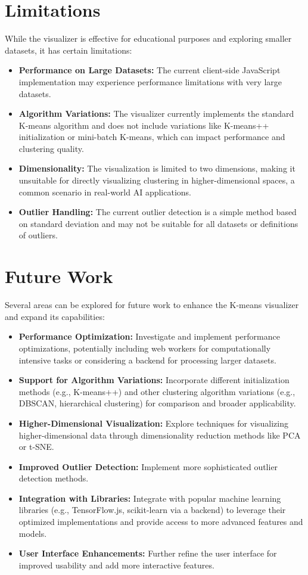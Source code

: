 \documentclass[12pt]{report}
\begin{document}
\section{Limitations}
While the visualizer is effective for educational purposes and exploring smaller datasets, it has certain limitations:
\begin{itemize}
    \item \textbf{Performance on Large Datasets:} The current client-side JavaScript implementation may experience performance limitations with very large datasets.
    \item \textbf{Algorithm Variations:} The visualizer currently implements the standard K-means algorithm and does not include variations like K-means++ initialization or mini-batch K-means, which can impact performance and clustering quality.
    \item \textbf{Dimensionality:} The visualization is limited to two dimensions, making it unsuitable for directly visualizing clustering in higher-dimensional spaces, a common scenario in real-world AI applications.
    \item \textbf{Outlier Handling:} The current outlier detection is a simple method based on standard deviation and may not be suitable for all datasets or definitions of outliers.
\end{itemize}
\section{Future Work}
Several areas can be explored for future work to enhance the K-means visualizer and expand its capabilities:
\begin{itemize}
    \item \textbf{Performance Optimization:} Investigate and implement performance optimizations, potentially including web workers for computationally intensive tasks or considering a backend for processing larger datasets.
    \item \textbf{Support for Algorithm Variations:} Incorporate different initialization methods (e.g., K-means++) and other clustering algorithm variations (e.g., DBSCAN, hierarchical clustering) for comparison and broader applicability.
    \item \textbf{Higher-Dimensional Visualization:} Explore techniques for visualizing higher-dimensional data through dimensionality reduction methods like PCA or t-SNE.
    \item \textbf{Improved Outlier Detection:} Implement more sophisticated outlier detection methods.
    \item \textbf{Integration with Libraries:} Integrate with popular machine learning libraries (e.g., TensorFlow.js, scikit-learn via a backend) to leverage their optimized implementations and provide access to more advanced features and models.
    \item \textbf{User Interface Enhancements:} Further refine the user interface for improved usability and add more interactive features.
\end{itemize}

\nocite{*}


\end{document}
